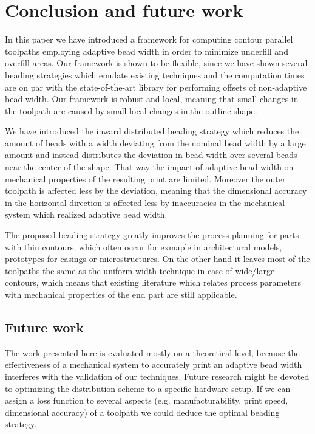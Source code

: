 \section{Conclusion and future work}
In this paper we have introduced a framework for computing contour parallel toolpaths employing adaptive bead width in order to minimize underfill and overfill areas.
Our framework is shown to be flexible, since we have shown several beading strategies which emulate existing techniques and the computation times are on par with the state-of-the-art library for performing offsets of non-adaptive bead width.
Our framework is robust and local, meaning that small changes in the toolpath are caused by small local changes in the outline shape.

We have introduced the inward distributed beading strategy which reduces the amount of beads with a width deviating from the nominal bead width by a large amount
and instead distributes the deviation in bead width over several beads near the center of the shape.
That way the impact of adaptive bead width on mechanical properties of the resulting print are limited.
Moreover the outer toolpath is affected less by the deviation, meaning that the dimensional accuracy in the horizontal direction is affected less by inaccuracies in the mechanical system which realized adaptive bead width.

The proposed beading strategy greatly improves the process planning for parts with thin contours, which often occur for exmaple in architectural models, prototypes for casings or microstructures.
On the other hand it leaves most of the toolpaths the same as the uniform width technique in case of wide/large contours, which means that existing literature which relates process parameters with mechanical properties of the end part are still applicable.


\subsection{Future work}
The work presented here is evaluated mostly on a theoretical level, because the effectiveness of a mechanical system to accurately print an adaptive bead width interferes with the validation of our techniques.
Future research might be devoted to optimizing the distribution scheme to a specific hardware setup.
If we can assign a loss function to several aspects (e.g. manufacturability, print speed, dimensional accuracy) of a toolpath we could deduce the optimal beading strategy.

